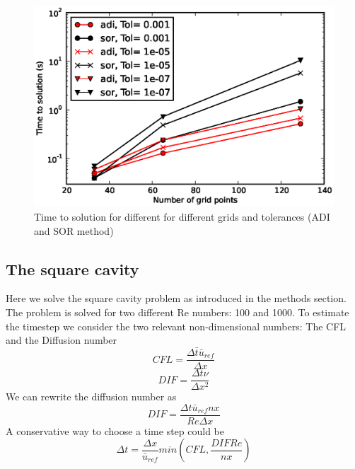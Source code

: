 \begin{figure}[H]
\centering
\includegraphics[scale=0.8]{"figs/timings_adi_sor"}
\caption{Time to solution for different for different grids and tolerances (ADI and SOR method)}
\label{fig:comp_time}
\end{figure}
%
\subsection{The square cavity}
Here we solve the square cavity problem as introduced in the methods section. The problem is solved for two different Re numbers: 100 and 1000. To estimate the timestep we consider the two relevant non-dimensional numbers: The CFL and the Diffusion number
\begin{equation}
CFL = \frac{\Delta \bar{t}\bar{u}_{ref}}{\Delta x}
\end{equation} 
\begin{equation}
DIF = \frac{\Delta t \nu}{\Delta x^2}
\end{equation}
We can rewrite the diffusion number as 
\begin{equation}
DIF = \frac{\Delta t \bar{u}_{ref} nx}{Re \Delta x}
\end{equation}
A conservative way to choose a time step could be
\begin{equation}
\Delta t = \frac{\Delta x}{\bar{u}_{ref}} min\left(CFL,\frac{DIF Re}{nx}\right)
\end{equation} 